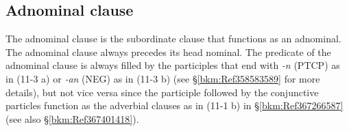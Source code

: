 \subsection{Adnominal clause}
\label{bkm:Ref306757474}\hypertarget{RefHeadingToc395697253}{}\label{bkm:Ref366707692}
The adnominal clause is the subordinate clause that functions as an adnominal. The adnominal clause always precedes its head nominal. The predicate of the adnominal clause is always filled by the participles that end with \textit{{}-n} (PTCP) as in (11-3 a) or \textit{{}-an} (NEG) as in (11-3 b) (see §\ref{bkm:Ref358583589} for more details), but not vice versa since the participle followed by the conjunctive particles function as the adverbial clauses as in (11-1 b) in §\ref{bkm:Ref367266587} (see also §\ref{bkm:Ref367401418}).

\tablefirsthead{}


